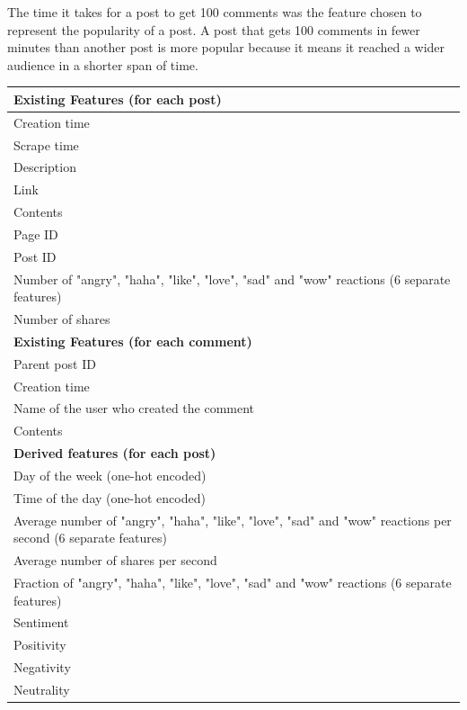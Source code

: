 \documentclass[twoside]{article}
\begin{document}
\begin{multicols}{2}
The time it takes for a post to get 100 comments was the feature chosen to represent the popularity of a post. A post that gets 100 comments in fewer minutes than another post is more popular because it means it reached a wider audience in a shorter span of time. 
\begin{center}
\label{tab:featurelist}
   \begin{tabular}{|p{5.5cm}|}
      \hline \textbf{Existing Features (for each post)} \\
      \hline {Creation time}\\
      \hline {Scrape time}\\
      \hline {Description}\\
      \hline {Link}\\
      \hline {Contents}\\
      \hline {Page ID}\\
      \hline {Post ID}\\
      \hline {Number of "angry", "haha", "like", "love", "sad" and "wow" reactions (6 separate features)}\\
      \hline {Number of shares}\\
      \hline \textbf{Existing Features (for each comment)} \\
      \hline {Parent post ID}\\
      \hline {Creation time}\\
      \hline {Name of the user who created the comment}\\
      \hline {Contents}\\
      \hline \textbf{Derived features (for each post)} \\
      \hline {Day of the week (one-hot encoded)}\\
      \hline {Time of the day (one-hot encoded)}\\
      \hline {Average number of "angry", "haha", "like", "love", "sad" and "wow" reactions per second (6 separate features)}\\
      \hline {Average number of shares per second}\\
      \hline {Fraction of "angry", "haha", "like", "love", "sad" and "wow" reactions (6 separate features)}\\
      \hline {Sentiment}\\
      \hline {Positivity}\\
      \hline {Negativity}\\
      \hline {Neutrality}\\
      \hline
   \end{tabular}
\end{center}

\end{multicols}
\end{document}
